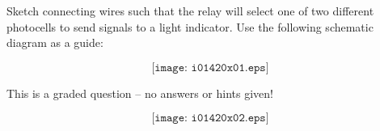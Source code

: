 

Sketch connecting wires such that the relay will select one of two different photocells to send signals to a light indicator.  Use the following schematic diagram as a guide:

$$\texttt{[image: i01420x01.eps]}$$

\vfil 

\eject






This is a graded question -- no answers or hints given!
 






$$\texttt{[image: i01420x02.eps]}$$




